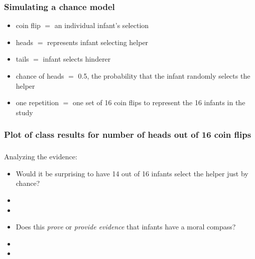 \begin{frame}
\frametitle{Simulating a chance model}
\begin{itemize}
\item
coin flip $=$ an individual infant's selection \\
\item
heads $=$ represents infant selecting helper\\
\item
tails $=$ infant selects hinderer \\
\item
chance of heads $=$ 0.5, the probability that the infant randomly selects the helper\\
\item
one repetition $=$ one set of 16 coin flips to represent the 16 infants in the study\\
\end{itemize}
\end{frame}


\begin{frame}
\frametitle{Plot of class results for number of heads out of 16 coin flips}

\end{frame}

\begin{frame}
\frametitle{\grp}
Analyzing the evidence:
\begin{itemize}
    \item
    Would it be surprising to have 14 out of 16 infants select the helper just by chance?
    \item[]
     \item[]
    \item
    Does this \emph{prove} or \emph{provide evidence} that infants have a moral compass?
     \item[]
      \item[]
\end{itemize}
\end{frame}



